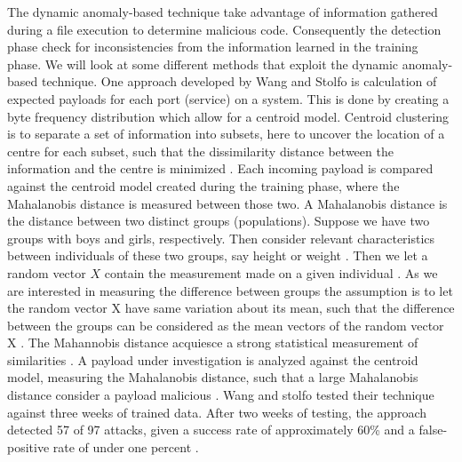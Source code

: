 \documentclass[12pt]{article} %
\begin{document}
The dynamic anomaly-based technique take advantage of information gathered during a file execution to determine malicious code. Consequently the detection phase check for inconsistencies from the information learned in the training phase. We will look at some different methods that exploit the dynamic anomaly-based technique. One approach developed by Wang and Stolfo \cite{idika2007survey} is calculation of expected payloads for each port (service) on a system. This is done by creating a byte frequency distribution which allow for a centroid model. Centroid clustering is to separate  a set of information into subsets, here to uncover the location of a centre for each subset, such that the dissimilarity distance between the information and the centre is minimized \cite{Heuristicmethods}. Each incoming payload is compared against the centroid model created during the training phase, where the Mahalanobis distance is measured between those two. A Mahalanobis distance is the distance between two distinct groups (populations). Suppose we have two groups with boys and girls, respectively. Then consider relevant characteristics between individuals of these two groups, say height or weight \cite{mclachlan1999mahalanobis}. Then we let a random vector $X$ contain the measurement made on a given individual \cite{mclachlan1999mahalanobis}. As we are interested in measuring the difference between groups the assumption is to let the random vector X have same variation about its mean, such that the difference between the groups can be considered as the mean vectors of the random vector X \cite{mclachlan1999mahalanobis}. The Mahannobis distance acquiesce a strong statistical measurement of similarities \cite{idika2007survey}. A payload under investigation is analyzed against the centroid model, measuring the Mahalanobis distance, such that a large Mahalanobis distance consider a payload malicious \cite{idika2007survey}. Wang and stolfo \cite{idika2007survey} tested their technique against three weeks of trained data. After two weeks of testing, the approach detected 57 of 97 attacks, given a success rate of approximately 60\% and a false-positive rate of under one percent \cite{idika2007survey}.
\end{document}

